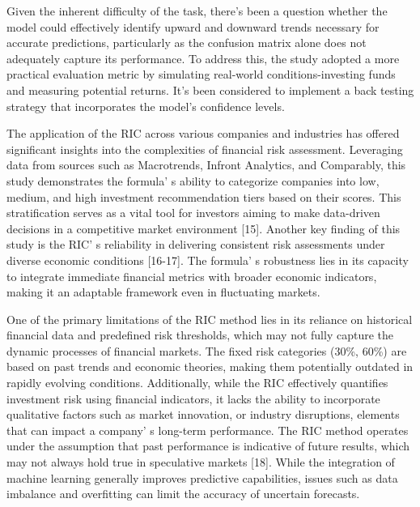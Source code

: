 \begin{multicols}{2}
Given the inherent difficulty of the task, there's been a question
whether the model could effectively identify upward and downward trends
necessary for accurate predictions, particularly as the confusion matrix
alone does not adequately capture its performance. To address this, the
study adopted a more practical evaluation metric by simulating
real-world conditions-investing funds and measuring potential returns.
It's been considered to implement a back testing strategy that
incorporates the model's confidence levels.

The application of the RIC across various companies and industries has
offered significant insights into the complexities of financial risk
assessment. Leveraging data from sources such as Macrotrends, Infront
Analytics, and Comparably, this study demonstrates the
formula' s ability to categorize companies into low,
medium, and high investment recommendation tiers based on their scores.
This stratification serves as a vital tool for investors aiming to make
data-driven decisions in a competitive market environment {[}15{]}.
Another key finding of this study is the RIC' s
reliability in delivering consistent risk assessments under diverse
economic conditions {[}16-17{]}. The formula' s
robustness lies in its capacity to integrate immediate financial metrics
with broader economic indicators, making it an adaptable framework even
in fluctuating markets.

One of the primary limitations of the RIC method lies in its reliance on
historical financial data and predefined risk thresholds, which may not
fully capture the dynamic processes of financial markets. The fixed risk
categories (30\%, 60\%) are based on past trends and economic theories,
making them potentially outdated in rapidly evolving conditions.
Additionally, while the RIC effectively quantifies investment risk using
financial indicators, it lacks the ability to incorporate qualitative
factors such as market innovation, or industry disruptions, elements
that can impact a company' s long-term performance. The
RIC method operates under the assumption that past performance is
indicative of future results, which may not always hold true in
speculative markets {[}18{]}. While the integration of machine learning
generally improves predictive capabilities, issues such as data
imbalance and overfitting can limit the accuracy of uncertain forecasts.


\end{multicols}
